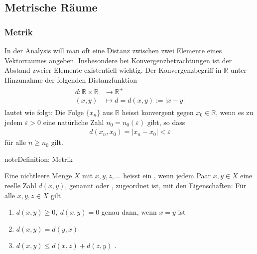 \documentclass[letterpaper,10pt,english]{jupyterBook}
\begin{document}
\subsection{Metrische Räume}
\label{\detokenize{Funktionalanalysis/Funktionalanalysis:metrische-raume}}

\subsubsection{Metrik}
\label{\detokenize{Funktionalanalysis/Funktionalanalysis:metrik}}
In der Analysis will man oft eine Distanz zwischen zwei Elemente eines Vektorraumes angeben. Insbesondere bei Konvergenzbetrachtungen ist der Abstand zweier Elemente existentiell wichtig. Der Konvergenzbegriff in \(\mathbb{R}\) unter Hinzunahme der folgenden Distanzfunktion
\begin{equation*}
\begin{split}\begin{split} d : \mathbb{R}\times\mathbb{R} & \to \mathbb{R}^+\\
(x,y) & \mapsto  d = d(x,y) := |x-y|\end{split}\end{split}
\end{equation*}
lautet wie folgt: Die Folge \(\{x_n\}\) aus \(\mathbb{R}\) heisst konvergent gegen \(x_0\in\mathbb{R}\), wenn es zu jedem \(\varepsilon > 0\) eine natürliche Zahl \(n_0 = n_0(\varepsilon)\) gibt, so dass
\begin{equation*}
\begin{split}d(x_n,x_0) = |x_n-x_0| < \varepsilon\end{split}
\end{equation*}
für alle \(n \ge n_0\) gilt.

\begin{sphinxadmonition}{note}{Definition: Metrik}

Eine nichtleere Menge \(X\) mit  \(x, y, z, \ldots\) heisst ein , wenn jedem Paar \(x, y \in X\) eine reelle Zahl \(d(x,y)\), genannt  oder , zugeordnet ist, mit den Eigenschaften: Für alle \(x,y,z\in X\) gilt
\begin{enumerate}
%
\item {} 
\(d(x,y) \ge 0,\ d(x,y) = 0\) genau dann, wenn \(x=y\) ist

\item {} 
\(d(x,y) = d(y,x)\) 

\item {} 
\(d(x,y) \le d(x,z) + d(z,y)\) .

\end{enumerate}
\end{sphinxadmonition}
\end{document}
